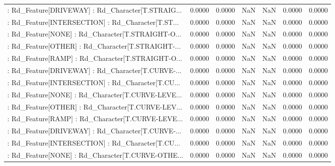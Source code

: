 \begin{longtable}{p{4cm}cccccc}
 : Rd\_Feature[DRIVEWAY] : Rd\_Character[T.STRAIG... &            0.0000 &            0.0000 &     NaN &          NaN &             0.0000 &            0.0000 \\
 : Rd\_Feature[INTERSECTION] : Rd\_Character[T.ST... &            0.0000 &            0.0000 &     NaN &          NaN &             0.0000 &            0.0000 \\
 : Rd\_Feature[NONE] : Rd\_Character[T.STRAIGHT-O... &            0.0000 &            0.0000 &     NaN &          NaN &             0.0000 &            0.0000 \\
 : Rd\_Feature[OTHER] : Rd\_Character[T.STRAIGHT-... &            0.0000 &            0.0000 &     NaN &          NaN &             0.0000 &            0.0000 \\
 : Rd\_Feature[RAMP] : Rd\_Character[T.STRAIGHT-O... &            0.0000 &            0.0000 &     NaN &          NaN &             0.0000 &            0.0000 \\
 : Rd\_Feature[DRIVEWAY] : Rd\_Character[T.CURVE-... &            0.0000 &            0.0000 &     NaN &          NaN &             0.0000 &            0.0000 \\
 : Rd\_Feature[INTERSECTION] : Rd\_Character[T.CU... &            0.0000 &            0.0000 &     NaN &          NaN &             0.0000 &            0.0000 \\
 : Rd\_Feature[NONE] : Rd\_Character[T.CURVE-LEVE... &            0.0000 &            0.0000 &     NaN &          NaN &             0.0000 &            0.0000 \\
 : Rd\_Feature[OTHER] : Rd\_Character[T.CURVE-LEV... &            0.0000 &            0.0000 &     NaN &          NaN &             0.0000 &            0.0000 \\
 : Rd\_Feature[RAMP] : Rd\_Character[T.CURVE-LEVE... &            0.0000 &            0.0000 &     NaN &          NaN &             0.0000 &            0.0000 \\
 : Rd\_Feature[DRIVEWAY] : Rd\_Character[T.CURVE-... &            0.0000 &            0.0000 &     NaN &          NaN &             0.0000 &            0.0000 \\
 : Rd\_Feature[INTERSECTION] : Rd\_Character[T.CU... &            0.0000 &            0.0000 &     NaN &          NaN &             0.0000 &            0.0000 \\
 : Rd\_Feature[NONE] : Rd\_Character[T.CURVE-OTHE... &            0.0000 &            0.0000 &     NaN &          NaN &             0.0000 &            0.0000 \\

\end{longtable}
